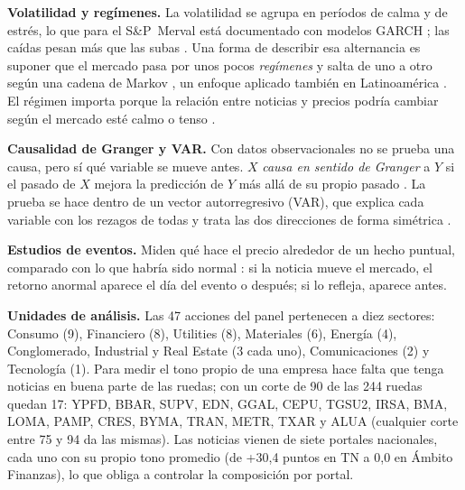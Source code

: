 \textbf{Volatilidad y regímenes.} La volatilidad se agrupa en períodos de calma y de estrés, lo
que para el S\&P~Merval está documentado con modelos GARCH \citep{segovia2022}; las caídas pesan
más que las subas \citep{otuki2008}. Una forma de describir esa alternancia es suponer que el
mercado pasa por unos pocos \textit{regímenes} y salta de uno a otro según una cadena de Markov
\citep{hamilton1989,rabiner1989}, un enfoque aplicado también en Latinoamérica
\citep{ataurima2016}. El régimen importa porque la relación entre noticias y precios podría
cambiar según el mercado esté calmo o tenso \citep{garcia2013}.

\textbf{Causalidad de Granger y VAR.} Con datos observacionales no se prueba una causa, pero sí
qué variable se mueve antes. $X$ \textit{causa en sentido de Granger} a $Y$ si el pasado de $X$
mejora la predicción de $Y$ más allá de su propio pasado \citep{granger1969}. La prueba se hace
dentro de un vector autorregresivo (VAR), que explica cada variable con los rezagos de todas y
trata las dos direcciones de forma simétrica \citep{sims1980,lutkepohl2005}.

\textbf{Estudios de eventos.} Miden qué hace el precio alrededor de un hecho puntual, comparado
con lo que habría sido normal \citep{mackinlay1997}: si la noticia mueve el mercado, el retorno
anormal aparece el día del evento o después; si lo refleja, aparece antes.

\textbf{Unidades de análisis.} Las 47 acciones del panel pertenecen a diez sectores: Consumo (9),
Financiero (8), Utilities (8), Materiales (6), Energía (4), Conglomerado, Industrial y Real Estate
(3 cada uno), Comunicaciones (2) y Tecnología (1). Para medir el tono propio de una empresa hace
falta que tenga noticias en buena parte de las ruedas; con un corte de 90 de las 244 ruedas
quedan 17: YPFD, BBAR, SUPV, EDN, GGAL, CEPU, TGSU2, IRSA, BMA, LOMA, PAMP, CRES, BYMA, TRAN,
METR, TXAR y ALUA (cualquier corte entre 75 y 94 da las mismas). Las noticias vienen de siete
portales nacionales, cada uno con su propio tono promedio (de +30,4 puntos en TN a 0,0 en Ámbito
Finanzas), lo que obliga a controlar la composición por portal.
